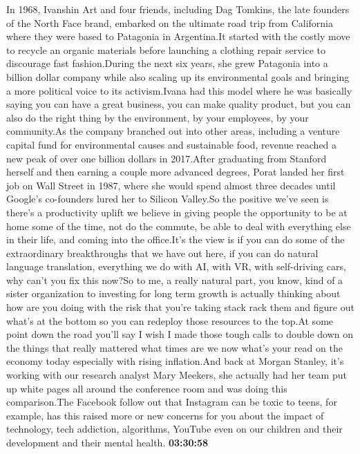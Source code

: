 \documentclass{article}%
\begin{document}
In 1968, Ivanshin Art and four friends, including Dag Tomkins, the late founders of the North Face brand, embarked on the ultimate road trip from California where they were based to Patagonia in Argentina.It started with the costly move to recycle an organic materials before launching a clothing repair service to discourage fast fashion.During the next six years, she grew Patagonia into a billion dollar company while also scaling up its environmental goals and bringing a more political voice to its activism.Ivana had this model where he was basically saying you can have a great business, you can make quality product, but you can also do the right thing by the environment, by your employees, by your community.As the company branched out into other areas, including a venture capital fund for environmental causes and sustainable food, revenue reached a new peak of over one billion dollars in 2017.After graduating from Stanford herself and then earning a couple more advanced degrees, Porat landed her first job on Wall Street in 1987, where she would spend almost three decades until Google's co{-}founders lured her to Silicon Valley.So the positive we've seen is there's a productivity uplift we believe in giving people the opportunity to be at home some of the time, not do the commute, be able to deal with everything else in their life, and coming into the office.It's the view is if you can do some of the extraordinary breakthroughs that we have out here, if you can do natural language translation, everything we do with AI, with VR, with self{-}driving cars, why can't you fix this now?So to me, a really natural part, you know, kind of a sister organization to investing for long term growth is actually thinking about how are you doing with the risk that you're taking stack rack them and figure out what's at the bottom so you can redeploy those resources to the top.At some point down the road you'll say I wish I made those tough calls to double down on the things that really mattered what times are we now what's your read on the economy today especially with rising inflation.And back at Morgan Stanley, it's working with our research analyst Mary Meekers, she actually had her team put up white pages all around the conference room and was doing this comparison.The Facebook follow out that Instagram can be toxic to teens, for example, has this raised more or new concerns for you about the impact of technology, tech addiction, algorithms, YouTube even on our children and their development and their mental health.%
\textbf{03:30:58}%
\newline%
\end{document}
